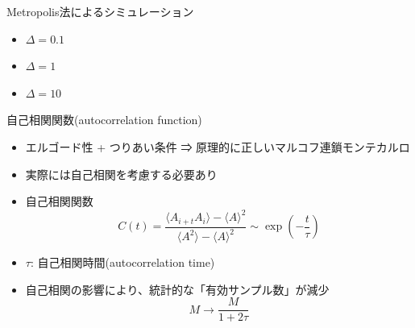 \documentclass[dvipdfmx]{beamer}
\begin{document}
\begin{frame}[t,fragile]{Metropolis法によるシミュレーション}
  \begin{itemize}
    \setlength{\itemsep}{1em}
  \item $\Delta = 0.1$
    
    \vspace*{-2em}\hfill {}
  \item $\Delta = 1$
    
    \vspace*{-2em}\hfill {}
  \item $\Delta = 10$
    
    \vspace*{-2em}\hfill {}
  \end{itemize}
\end{frame}

\begin{frame}[t,fragile]{自己相関関数(autocorrelation function)}
  \begin{itemize}
    \setlength{\itemsep}{1em}
  \item エルゴード性 + つりあい条件 ⇒ 原理的に正しいマルコフ連鎖モンテカルロ
  \item 実際には自己相関を考慮する必要あり
  \item 自己相関関数
    \[
    C(t) = \frac{\langle A_{i+t}A_i \rangle - \langle A \rangle^2}{\langle A^2 \rangle - \langle A \rangle^2} \sim \exp(-\frac{t}{\tau})
    \]
  \item $\tau$: 自己相関時間(autocorrelation time)
  \item 自己相関の影響により、統計的な「有効サンプル数」が減少
    \[
    M \rightarrow \frac{M}{1+2\tau}
    \]
  \end{itemize}
\end{frame}
\end{document}
